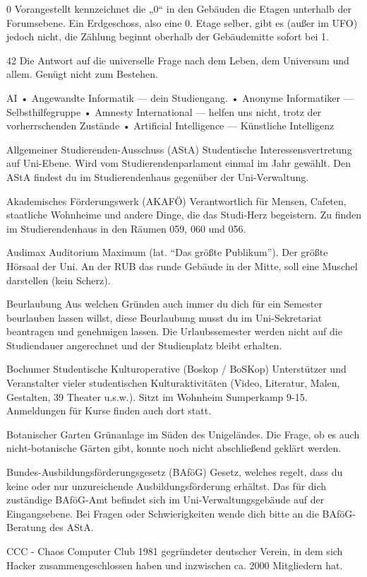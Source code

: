 0
Vorangestellt kennzeichnet die „0“ in den Gebäuden die Etagen unterhalb der Forumsebene. Ein Erdgeschoss, also eine 0. Etage selber, gibt es (außer im UFO) jedoch nicht, die Zählung beginnt oberhalb der Gebäudemitte sofort bei 1.

42
Die Antwort auf die universelle Frage nach dem Leben, dem Universum und allem. Genügt nicht zum Bestehen.

AI
•	Angewandte Informatik — dein Studiengang.
•	Anonyme Informatiker — Selbsthilfegruppe
•	Amnesty International — helfen uns nicht, trotz der vorherrschenden Zustände
•	Artificial Intelligence — Künstliche Intelligenz

Allgemeiner Studierenden-Ausschuss (AStA)
Studentische Interessensvertretung auf Uni-Ebene. Wird vom Studierendenparlament einmal im Jahr gewählt. Den AStA findest du im Studierendenhaus gegenüber der Uni-Verwaltung.

Akademisches Förderungswerk (AKAFÖ)
Verantwortlich für Mensen, Cafeten, staatliche Wohnheime und andere Dinge, die das Studi-Herz begeistern. Zu finden im Studierendenhaus in den Räumen 059, 060 und 056.

Audimax
Auditorium Maximum (lat. “Das größte Publikum”). Der größte Hörsaal der Uni. An der RUB das runde Gebäude in der Mitte, soll eine Muschel darstellen (kein Scherz).

Beurlaubung
Aus welchen Gründen auch immer du dich für ein Semester beurlauben lassen willst, diese Beurlaubung musst du im Uni-Sekretariat beantragen und genehmigen lassen. Die Urlaubssemester werden nicht auf die Studiendauer angerechnet und der Studienplatz bleibt erhalten.

Bochumer Studentische Kulturoperative (Boskop / BoSKop)
Unterstützer und Veranstalter vieler studentischen Kulturaktivitäten (Video, Literatur, Malen, Gestalten, 39 Theater u.s.w.). Sitzt im Wohnheim Sumperkamp 9-15. Anmeldungen für Kurse finden auch dort statt.

Botanischer Garten
Grünanlage im Süden des Unigeländes. Die Frage, ob es auch nicht-botanische Gärten gibt, konnte noch nicht abschließend geklärt werden.

Bundes-Ausbildungsförderungsgesetz (BAföG)
Gesetz, welches regelt, dass du keine oder nur unzureichende Ausbildungsförderung erhältst. Das für dich zuständige BAföG-Amt befindet sich im Uni-Verwaltungsgebäude auf der Eingangsebene. Bei Fragen oder Schwierigkeiten wende dich bitte an die BAföG-Beratung des AStA.

CCC - Chaos Computer Club
1981 gegründeter deutscher Verein, in dem sich Hacker zusammengeschlossen haben und inzwischen ca. 2000 Mitgliedern hat.

